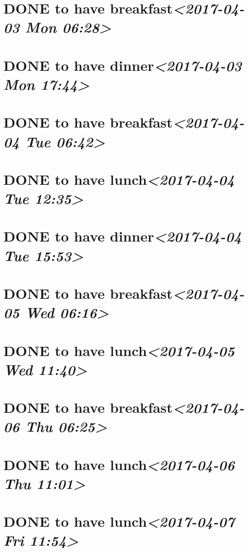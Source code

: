 \documentclass[cyan]{elegantnote}
\begin{document}
\section{{\bfseries\sffamily DONE} to have breakfast\textit{<2017-04-03 Mon 06:28>}}
\label{sec:org3b4aef5}
\section{{\bfseries\sffamily DONE} to have dinner\textit{<2017-04-03 Mon 17:44>}}
\label{sec:orged19f65}
\section{{\bfseries\sffamily DONE} to have breakfast\textit{<2017-04-04 Tue 06:42>}}
\label{sec:orgdd0fd44}
\section{{\bfseries\sffamily DONE} to have lunch\textit{<2017-04-04 Tue 12:35>}}
\label{sec:org6e43338}
\section{{\bfseries\sffamily DONE} to have dinner\textit{<2017-04-04 Tue 15:53>}}
\label{sec:org917127a}
\section{{\bfseries\sffamily DONE} to have breakfast\textit{<2017-04-05 Wed 06:16>}}
\label{sec:org88ac1d5}
\section{{\bfseries\sffamily DONE} to have lunch\textit{<2017-04-05 Wed 11:40>}}
\label{sec:org4ae2c18}
\section{{\bfseries\sffamily DONE} to have breakfast\textit{<2017-04-06 Thu 06:25>}}
\label{sec:orgce2af5e}
\section{{\bfseries\sffamily DONE} to have lunch\textit{<2017-04-06 Thu 11:01>}}
\label{sec:org170d02c}
\section{{\bfseries\sffamily DONE} to have lunch\textit{<2017-04-07 Fri 11:54>}}
\label{sec:orgbda1d7f}
\end{document}

